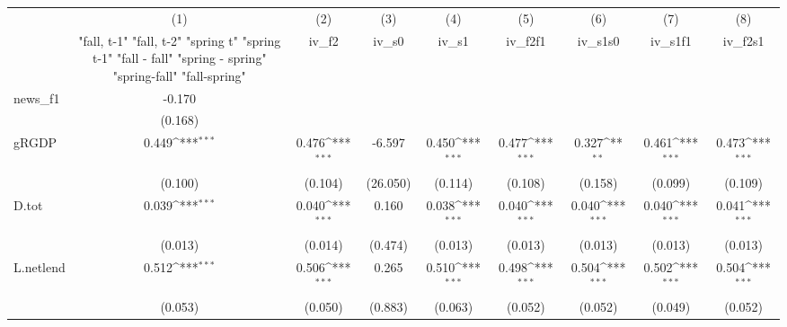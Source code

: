 {
\def\sym#1{\ifmmode^{#1}\else\(^{#1}\)\fi}
\begin{tabular}{l*{8}{c}}
\toprule
            &\multicolumn{1}{c}{(1)}&\multicolumn{1}{c}{(2)}&\multicolumn{1}{c}{(3)}&\multicolumn{1}{c}{(4)}&\multicolumn{1}{c}{(5)}&\multicolumn{1}{c}{(6)}&\multicolumn{1}{c}{(7)}&\multicolumn{1}{c}{(8)}\\
            &\multicolumn{1}{c}{  "fall, t-1" "fall, t-2" "spring t" "spring t-1"  "fall - fall" "spring - spring" "spring-fall" "fall-spring" }&\multicolumn{1}{c}{iv\_f2}&\multicolumn{1}{c}{iv\_s0}&\multicolumn{1}{c}{iv\_s1}&\multicolumn{1}{c}{iv\_f2f1}&\multicolumn{1}{c}{iv\_s1s0}&\multicolumn{1}{c}{iv\_s1f1}&\multicolumn{1}{c}{iv\_f2s1}\\
\midrule
news\_f1     &      -0.170         &                     &                     &                     &                     &                     &                     &                     \\
            &     (0.168)         &                     &                     &                     &                     &                     &                     &                     \\
\addlinespace
gRGDP       &       0.449\sym{***}&       0.476\sym{***}&      -6.597         &       0.450\sym{***}&       0.477\sym{***}&       0.327\sym{**} &       0.461\sym{***}&       0.473\sym{***}\\
            &     (0.100)         &     (0.104)         &    (26.050)         &     (0.114)         &     (0.108)         &     (0.158)         &     (0.099)         &     (0.109)         \\
\addlinespace
D.tot       &       0.039\sym{***}&       0.040\sym{***}&       0.160         &       0.038\sym{***}&       0.040\sym{***}&       0.040\sym{***}&       0.040\sym{***}&       0.041\sym{***}\\
            &     (0.013)         &     (0.014)         &     (0.474)         &     (0.013)         &     (0.013)         &     (0.013)         &     (0.013)         &     (0.013)         \\
\addlinespace
L.netlend   &       0.512\sym{***}&       0.506\sym{***}&       0.265         &       0.510\sym{***}&       0.498\sym{***}&       0.504\sym{***}&       0.502\sym{***}&       0.504\sym{***}\\
            &     (0.053)         &     (0.050)         &     (0.883)         &     (0.063)         &     (0.052)         &     (0.052)         &     (0.049)         &     (0.052)         \\

\end{tabular}}
